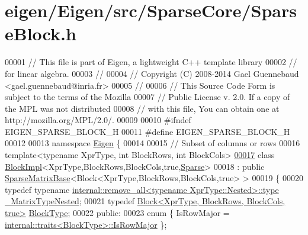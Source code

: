 \hypertarget{eigen_2_eigen_2src_2_sparse_core_2_sparse_block_8h_source}{}\section{eigen/\+Eigen/src/\+Sparse\+Core/\+Sparse\+Block.h}
\label{eigen_2_eigen_2src_2_sparse_core_2_sparse_block_8h_source}

\begin{DoxyCode}
00001 \textcolor{comment}{// This file is part of Eigen, a lightweight C++ template library}
00002 \textcolor{comment}{// for linear algebra.}
00003 \textcolor{comment}{//}
00004 \textcolor{comment}{// Copyright (C) 2008-2014 Gael Guennebaud <gael.guennebaud@inria.fr>}
00005 \textcolor{comment}{//}
00006 \textcolor{comment}{// This Source Code Form is subject to the terms of the Mozilla}
00007 \textcolor{comment}{// Public License v. 2.0. If a copy of the MPL was not distributed}
00008 \textcolor{comment}{// with this file, You can obtain one at http://mozilla.org/MPL/2.0/.}
00009 
00010 \textcolor{preprocessor}{#ifndef EIGEN\_SPARSE\_BLOCK\_H}
00011 \textcolor{preprocessor}{#define EIGEN\_SPARSE\_BLOCK\_H}
00012 
00013 \textcolor{keyword}{namespace }\hyperlink{namespace_eigen}{Eigen} \{
00014 
00015 \textcolor{comment}{// Subset of columns or rows}
00016 \textcolor{keyword}{template}<\textcolor{keyword}{typename} XprType, \textcolor{keywordtype}{int} BlockRows, \textcolor{keywordtype}{int} BlockCols>
\hyperlink{class_eigen_1_1_block_impl_3_01_xpr_type_00_01_block_rows_00_01_block_cols_00_01true_00_01_sparse_01_4}{00017} \textcolor{keyword}{class }\hyperlink{class_eigen_1_1_block_impl}{BlockImpl}<XprType,BlockRows,BlockCols,true,\hyperlink{struct_eigen_1_1_sparse}{Sparse}>
00018   : \textcolor{keyword}{public} \hyperlink{group___sparse_core___module_class_eigen_1_1_sparse_matrix_base}{SparseMatrixBase}<Block<XprType,BlockRows,BlockCols,true> >
00019 \{
00020     \textcolor{keyword}{typedef} \textcolor{keyword}{typename} \hyperlink{group___sparse_core___module}{internal::remove\_all<typename XprType::Nested>::type}
       \hyperlink{group___sparse_core___module}{\_MatrixTypeNested};
00021     \textcolor{keyword}{typedef} \hyperlink{group___core___module_class_eigen_1_1_block}{Block<XprType, BlockRows, BlockCols, true>} 
      \hyperlink{group___core___module_class_eigen_1_1_block}{BlockType};
00022 \textcolor{keyword}{public}:
00023     \textcolor{keyword}{enum} \{ IsRowMajor = \hyperlink{struct_eigen_1_1internal_1_1traits}{internal::traits<BlockType>::IsRowMajor} \};

\end{DoxyCode}
